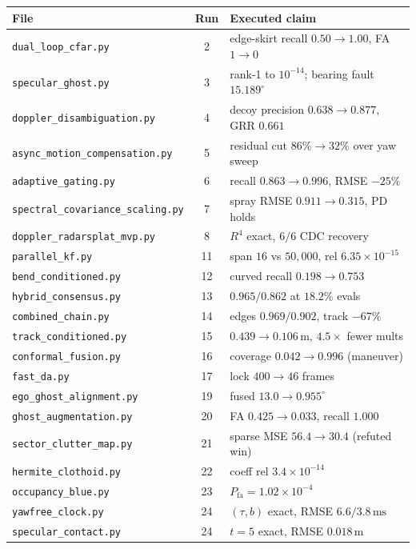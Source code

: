 \documentclass[11pt,oneside]{book}
\begin{document}
{\small
\begin{tabularx}{\linewidth}{@{}lcp{7.5cm}@{}}
\toprule
File & Run & Executed claim \\
\midrule
\texttt{dual\_loop\_cfar.py} & 2 & edge-skirt recall $0.50\to1.00$, FA $1\to0$ \\
\texttt{specular\_ghost.py} & 3 & rank-1 to $10^{-14}$; bearing fault $15.189^\circ$ \\
\texttt{doppler\_disambiguation.py} & 4 & decoy precision $0.638\to0.877$, GRR $0.661$ \\
\texttt{async\_motion\_compensation.py} & 5 & residual cut $86\%\to32\%$ over yaw sweep \\
\texttt{adaptive\_gating.py} & 6 & recall $0.863\to0.996$, RMSE $-25\%$ \\
\texttt{spectral\_covariance\_scaling.py} & 7 & spray RMSE $0.911\to0.315$, PD holds \\
\texttt{doppler\_radarsplat\_mvp.py} & 8 & $R^4$ exact, $6/6$ CDC recovery \\
\texttt{parallel\_kf.py} & 11 & span $16$ vs $50{,}000$, rel $6.35\times10^{-15}$ \\
\texttt{bend\_conditioned.py} & 12 & curved recall $0.198\to0.753$ \\
\texttt{hybrid\_consensus.py} & 13 & $0.965/0.862$ at $18.2\%$ evals \\
\texttt{combined\_chain.py} & 14 & edges $0.969/0.902$, track $-67\%$ \\
\texttt{track\_conditioned.py} & 15 & $0.439\to0.106\,\mathrm{m}$, $4.5\times$ fewer mults \\
\texttt{conformal\_fusion.py} & 16 & coverage $0.042\to0.996$ (maneuver) \\
\texttt{fast\_da.py} & 17 & lock $400\to46$ frames \\
\texttt{ego\_ghost\_alignment.py} & 19 & fused $13.0\to0.955^\circ$ \\
\texttt{ghost\_augmentation.py} & 20 & FA $0.425\to0.033$, recall $1.000$ \\
\texttt{sector\_clutter\_map.py} & 21 & sparse MSE $56.4\to30.4$ (refuted win) \\
\texttt{hermite\_clothoid.py} & 22 & coeff rel $3.4\times10^{-14}$ \\
\texttt{occupancy\_blue.py} & 23 & $P_{\mathrm{fa}}=1.02\times10^{-4}$ \\
\texttt{yawfree\_clock.py} & 24 & $(\tau,b)$ exact, RMSE $6.6/3.8\,\mathrm{ms}$ \\
\texttt{specular\_contact.py} & 24 & $t=5$ exact, RMSE $0.018\,\mathrm{m}$ \\

\end{tabularx}}
\end{document}
